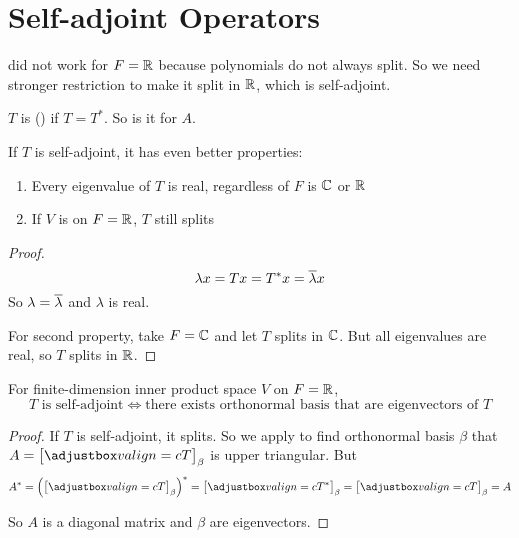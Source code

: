 \section{Self-adjoint Operators}

 did not work for $F=\mathbb{R}$ because polynomials do not always split. So we need stronger restriction to make it split in $\mathbb{R}$, which is self-adjoint.

\begin{definition}
    $T$ is  () if $T = T^*$. So is it for $A$.
\end{definition}

\begin{theorem}
    If $T$ is self-adjoint, it has even better properties:
\begin{enumerate}
    \item Every eigenvalue of $T$ is real, regardless of $F$ is $\mathbb{C}$ or $\mathbb{R}$
    \item If $V$ is on $F=\mathbb{R}$, $T$ still splits
\end{enumerate}
\end{theorem}
\begin{proof}
    \begin{equation*}
        \lambda x = Tx = T^* x = \overline{\lambda} x
    \end{equation*}
    So $\lambda = \overline{\lambda}$ and $\lambda$ is real.
    
    For second property, take $F=\mathbb{C}$ and let $T$ splits in $\mathbb{C}$. But all eigenvalues are real, so $T$ splits in $\mathbb{R}$.
\end{proof}

\begin{theorem}
    For finite-dimension inner product space $V$ on $F=\mathbb{R}$, 
    \begin{equation}
        T \text{ is self-adjoint} \Leftrightarrow \text{there exists orthonormal basis that are eigenvectors of } T
    \end{equation}
\end{theorem}
\begin{proof}
    If $T$ is self-adjoint, it splits. So we apply  to find orthonormal basis $\beta$ that $A = \coordinate{T}_\beta$ is upper triangular. But
    \begin{equation*}
        A^* = \left(\coordinate{T}_\beta\right)^* = \coordinate{T^*}_\beta = \coordinate{T}_\beta = A
    \end{equation*}
    
    So $A$ is a diagonal matrix and $\beta$ are eigenvectors.
\end{proof}

